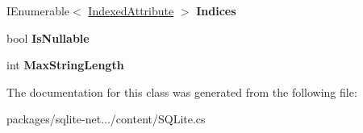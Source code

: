 \begin{DoxyCompactItemize}
\item 
\hypertarget{classSQLite_1_1TableMapping_1_1Column_aef56797646625e0a70513458160362f5}{I\-Enumerable$<$ \hyperlink{classSQLite_1_1IndexedAttribute}{Indexed\-Attribute} $>$ {\bfseries Indices}}\label{classSQLite_1_1TableMapping_1_1Column_aef56797646625e0a70513458160362f5}

\item 
\hypertarget{classSQLite_1_1TableMapping_1_1Column_a9babe38927857b93beb3cab2f8e814dc}{bool {\bfseries Is\-Nullable}}\label{classSQLite_1_1TableMapping_1_1Column_a9babe38927857b93beb3cab2f8e814dc}

\item 
\hypertarget{classSQLite_1_1TableMapping_1_1Column_a68f8028c882fa4501e7ab8d79c15b372}{int {\bfseries Max\-String\-Length}}\label{classSQLite_1_1TableMapping_1_1Column_a68f8028c882fa4501e7ab8d79c15b372}

\end{DoxyCompactItemize}


The documentation for this class was generated from the following file\-:\begin{DoxyCompactItemize}
\item 
packages/sqlite-\/net.../content/S\-Q\-Lite.\-cs\end{DoxyCompactItemize}
